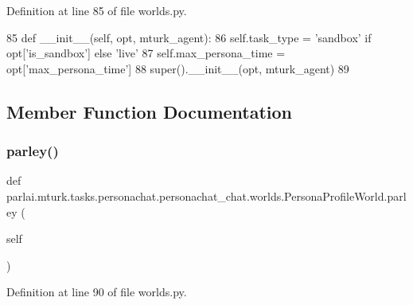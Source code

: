 Definition at line 85 of file worlds.\+py.


\begin{DoxyCode}
85     \textcolor{keyword}{def }\_\_init\_\_(self, opt, mturk\_agent):
86         self.task\_type = \textcolor{stringliteral}{'sandbox'} \textcolor{keywordflow}{if} opt[\textcolor{stringliteral}{'is\_sandbox'}] \textcolor{keywordflow}{else} \textcolor{stringliteral}{'live'}
87         self.max\_persona\_time = opt[\textcolor{stringliteral}{'max\_persona\_time'}]
88         super().\_\_init\_\_(opt, mturk\_agent)
89 
\end{DoxyCode}


\subsection{Member Function Documentation}
\mbox{\label{classparlai_1_1mturk_1_1tasks_1_1personachat_1_1personachat__chat_1_1worlds_1_1PersonaProfileWorld_a7c44d8255de135cf0539ad1ef14ae05d}} 
\subsubsection{\texorpdfstring{parley()}{parley()}}
{\footnotesize\ttfamily def parlai.\+mturk.\+tasks.\+personachat.\+personachat\+\_\+chat.\+worlds.\+Persona\+Profile\+World.\+parley (\begin{DoxyParamCaption}\item[{}]{self }\end{DoxyParamCaption})}



Definition at line 90 of file worlds.\+py.


